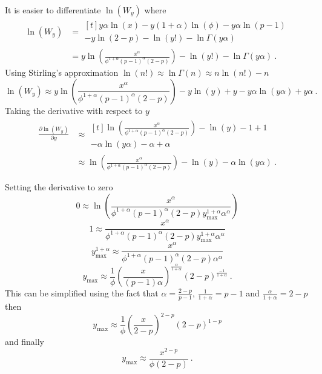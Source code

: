 It is easier to differentiate $\ln(W_y)$ where
\begin{align}
  \ln(W_y) &= 
  \begin{multlined}[t]
    y\alpha\ln(x)-y(1+\alpha)\ln(\phi)-y\alpha\ln(p-1)\\-y\ln(2-p)-\ln(y!)-\ln\Gamma(y\alpha)
  \end{multlined}
  \nonumber\\
  &=
  y
  \ln\left(
    \frac{x^\alpha}{\phi^{1+\alpha}(p-1)^\alpha(2-p)}
  \right)
  -\ln(y!)-\ln\Gamma(y\alpha)
  \ .
\end{align}
Using Stirling's approximation $\ln(n!)\approx\ln\Gamma(n)\approx n\ln(n!)-n$
\begin{equation}
  \ln(W_y) \approx
  y\ln\left(
    \frac{x^\alpha}{\phi^{1+\alpha}(p-1)^\alpha(2-p)}
  \right)
  -y\ln(y)+y-y\alpha\ln(y\alpha) + y\alpha
  \ .
\end{equation}
Taking the derivative with respect to $y$
\begin{align}
  \frac{\partial \ln(W_y)}{\partial y} &\approx
  \begin{multlined}[t]
    \ln\left(
      \frac{x^\alpha}{\phi^{1+\alpha}(p-1)^\alpha(2-p)}
    \right)
    -\ln(y)-1+1
    \\
    -\alpha\ln(y\alpha)-\alpha+\alpha
  \end{multlined}
  \nonumber\\
  &\approx
  \ln\left(
    \frac{x^\alpha}{\phi^{1+\alpha}(p-1)^\alpha(2-p)}
  \right)
  -\ln(y)
  -\alpha\ln(y\alpha)
  \ .
\end{align}

Setting the derivative to zero
\begin{equation*}
  0 \approx \ln\left(
    \frac{
      x^\alpha
    }
    {
      \phi^{1+\alpha}(p-1)^\alpha(2-p)y_{\text{max}}^{1+\alpha}\alpha^\alpha
    }
  \right)
\end{equation*}
\begin{equation*}
  1 \approx 
  \frac{x^\alpha}{\phi^{1+\alpha}(p-1)^\alpha(2-p)y_{\text{max}}^{1+\alpha}\alpha^\alpha}
\end{equation*}
\begin{equation*}
  y_{\text{max}}^{1+\alpha} \approx 
  \frac{x^\alpha}{\phi^{1+\alpha}(p-1)^\alpha(2-p)\alpha^\alpha}
\end{equation*}
\begin{equation*}
  y_{\text{max}} \approx 
  \frac{1}{\phi}
  \left(
    \frac{x}{(p-1)\alpha}
  \right)^{\frac{\alpha}{1+\alpha}}
  (2-p)^{\frac{-1}{1+\alpha}}
  \ .
\end{equation*}
This can be simplified using the fact that $\alpha=\frac{2-p}{p-1}$, $\frac{1}{1+\alpha} = p-1$ and $\frac{\alpha}{1+\alpha} = 2-p$ then
\begin{equation*}
  y_{\text{max}} \approx 
  \frac{1}{\phi}
  \left(
    \frac{x}{2-p}
  \right)^{2-p}
  (2-p)^{1-p}
\end{equation*}
and finally
\begin{equation}
  y_{\text{max}} \approx \frac{x^{2-p}}{\phi(2-p)}
  \ .
\end{equation}

